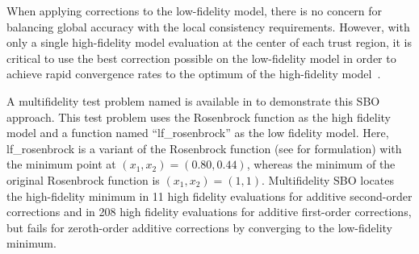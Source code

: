 When applying corrections to the low-fidelity model, there is no
concern for balancing global accuracy with the local consistency
requirements.  However, with only a single high-fidelity model evaluation
at the center of each trust region, it is critical to use the best
correction possible on the low-fidelity model in order to achieve
rapid convergence rates to the optimum of the high-fidelity
model~\cite{Eld04}.


A multifidelity test problem named
 is available in
 to demonstrate this SBO approach. This test
problem uses the Rosenbrock function as the high fidelity model and a
function named ``lf\_rosenbrock'' as the low fidelity model. Here,
lf\_rosenbrock is a variant of the Rosenbrock function (see
 for formulation) with the
minimum point at $(x_1,x_2)=(0.80,0.44)$, whereas the minimum of the
original Rosenbrock function is $(x_1,x_2)=(1,1)$. Multifidelity SBO
locates the high-fidelity minimum in 11 high fidelity evaluations for
additive second-order corrections and in 208 high fidelity evaluations
for additive first-order corrections, but fails for zeroth-order
additive corrections by converging to the low-fidelity minimum.

